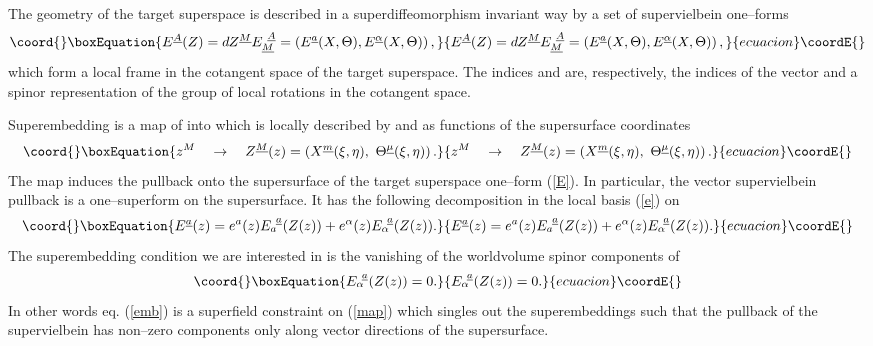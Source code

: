 \documentclass[a4paper,12pt]{article}
\begin{document}
The geometry of the target superspace is described in a
superdiffeomorphism invariant way by a set of supervielbein
one--forms
\begin{equation}\coord{}\boxEquation{\label{E}
E^{\underline A}(Z)=dZ^{\underline M}E^{~\underline A}_{\underline
M}=\left( E^{\underline a}(X,\Theta), E^{\underline
\alpha}(X,\Theta)\right),
}{E^{\underline A}(Z)=dZ^{\underline M}E^{~\underline A}_{\underline
M}=\left( E^{\underline a}(X,\Theta), E^{\underline
\alpha}(X,\Theta)\right),
}{ecuacion}\coordE{}\end{equation}
which form a local frame in the cotangent space of the target
superspace. The indices \coordHE{} and \myHighlight{$\underline\alpha$}\coordHE{} are,
respectively, the indices of the vector and a spinor
representation of the group \coordHE{} of local rotations in the
\coordHE{} cotangent space.

Superembedding is a map of \coordHE{} into \coordHE{} which is
locally described by \coordHE{} and
\myHighlight{$\Theta^{\underline\mu}$}\coordHE{} as functions of the supersurface
coordinates
\begin{equation}\coord{}\boxEquation{\label{map}
z^M\quad \rightarrow \quad Z^{\underline M}(z)=\left(X^{\underline
m}(\xi, \eta),~\Theta^{\underline\mu}(\xi,\eta)\right).
}{z^M\quad \rightarrow \quad Z^{\underline M}(z)=\left(X^{\underline
m}(\xi, \eta),~\Theta^{\underline\mu}(\xi,\eta)\right).
}{ecuacion}\coordE{}\end{equation}
 The map induces the pullback onto the supersurface of the
target superspace one--form (\ref{E}). In particular, the vector
supervielbein \coordHE{} pullback is a one--superform on
the supersurface. It has the following decomposition in the local
basis (\ref{e}) on \coordHE{}
\begin{equation}\coord{}\boxEquation{\label{pull}
E^{\underline a}(z)=e^a(z)E^{~\underline
a}_a(Z(z))+e^\alpha(z)E^{~\underline a}_\alpha(Z(z)).
}{E^{\underline a}(z)=e^a(z)E^{~\underline
a}_a(Z(z))+e^\alpha(z)E^{~\underline a}_\alpha(Z(z)).
}{ecuacion}\coordE{}\end{equation}
The superembedding condition we are interested in is the
vanishing of the worldvolume spinor components of \coordHE{}
\begin{equation}\coord{}\boxEquation{\label{emb}
E^{~\underline a}_\alpha(Z(z))=0.
}{E^{~\underline a}_\alpha(Z(z))=0.
}{ecuacion}\coordE{}\end{equation}
In other words eq. (\ref{emb}) is a superfield constraint on
(\ref{map}) which singles out the superembeddings such that the
pullback of the supervielbein \coordHE{} has non--zero
components only along vector directions of the supersurface.
\end{document}
